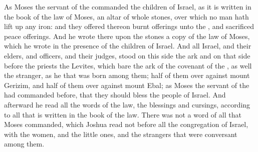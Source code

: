 \begin{biblechapter}
\verse As Moses the servant of the \LORD commanded the children of Israel, as it is written in the book of the law of Moses, an altar of whole stones, over which no man hath lift up any iron: and they offered thereon burnt offerings unto the \LORD, and sacrificed peace offerings.
\verse And he wrote there upon the stones a copy of the law of Moses, which he wrote in the presence of the children of Israel.
\verse And all Israel, and their elders, and officers, and their judges, stood on this side the ark and on that side before the priests the Levites, which bare the ark of the covenant of the \LORD, as well the stranger, as he that was born among them; half of them over against mount Gerizim, and half of them over against mount Ebal; as Moses the servant of the \LORD had commanded before, that they should bless the people of Israel.
\verse And afterward he read all the words of the law, the blessings and cursings, according to all that is written in the book of the law.
\verse There was not a word of all that Moses commanded, which Joshua read not before all the congregation of Israel, with the women, and the little ones, and the strangers that were conversant among them.
\end{biblechapter}

